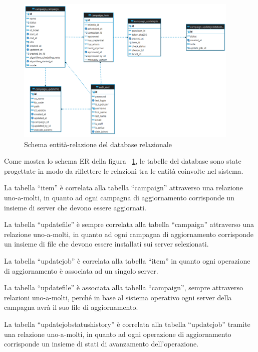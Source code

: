 \begin{figure}[H]
  \begin{flushright}
    \centering
    \includegraphics[width=0.95\textwidth]{imgs/ER_schema.png}
    \caption{Schema entità-relazione del database relazionale}
    \label{fig:Schema entità-relazione del database relazionale}
  \end{flushright}
\end{figure}

Come mostra lo schema ER della figura
~\ref{fig:Schema entità-relazione del database relazionale}, le tabelle del database sono state 
progettate in modo da riflettere le relazioni tra le entità coinvolte 
nel sistema.

La tabella “item” è correlata alla tabella “campaign” attraverso una 
relazione uno-a-molti, in quanto ad ogni campagna di aggiornamento 
corrisponde un insieme di server che devono essere aggiornati.

La tabella “updatefile” è sempre correlata alla tabella “campaign” 
attraverso una relazione uno-a-molti, in quanto ad ogni campagna di 
aggiornamento corrisponde un insieme di file che 
devono essere installati sui server selezionati.

La tabella “updatejob” è correlata alla tabella “item” in quanto ogni 
operazione di aggiornamento è associata ad un singolo server.

La tabella “updatefile” è associata alla tabella “campaign”, sempre 
attraverso relazioni uno-a-molti, perché in base al sistema operativo 
ogni server della campagna avrà il suo file di aggiornamento. 

La tabella “updatejobstatushistory” è correlata alla tabella 
“updatejob” tramite una relazione uno-a-molti, in quanto ad ogni 
operazione di aggiornamento corrisponde un insieme di stati di 
avanzamento dell'operazione.

